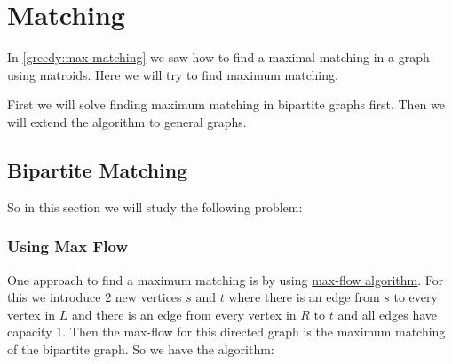 \chapter{Matching}\parinn
In \autoref{greedy:max-matching} we saw how to find a maximal matching in  a graph using matroids. Here we will try to find maximum matching.

\begin{algoprob}
\end{algoprob}

First we will solve finding maximum matching in bipartite graphs first. Then we will extend the algorithm to general graphs.
\section{Bipartite Matching}
So in this section we will study the following problem:
\begin{algoprob}
\end{algoprob}
\subsection{Using Max Flow}
One approach to find a maximum matching is by using \hyperref[max-flow]{max-flow algorithm}. For this we introduce 2 new vertices $s$ and $t$ where there is an edge from $s$ to every vertex in $L$ and there is an edge from every vertex in $R$ to $t$ and all edges have capacity $1$. Then the max-flow for this directed graph is the maximum matching of the bipartite graph. So we have the algorithm:

\begin{algorithm}\DontPrintSemicolon
{}
\caption{}

\end{algorithm} 


